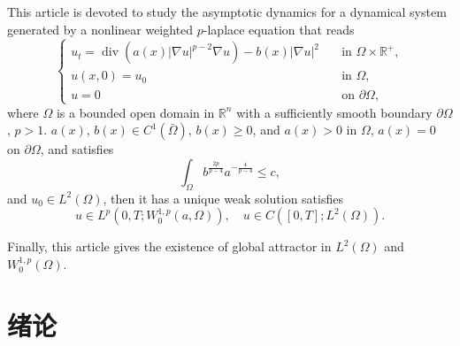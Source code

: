 \documentclass[oneside,longtitle]{LZUthesis}
\numberwithin{equation}{chapter}
\newcommand*\abs[1]{\lvert#1\rvert}
\newcommand\R{\mathbb{R}}
\DeclareMathOperator{\Div}{div}
\begin{document}

\begin{englishabstract}
	This article is devoted to study the asymptotic dynamics for a dynamical system generated by a nonlinear
	weighted $p$-laplace equation that reads
	\begin{equation}\label{eq:main}
		\begin{cases}
			u_t = \Div(a(x)\abs{\nabla u}^{p-2}\nabla u) - b(x)\abs{\nabla u}^2 \quad &\text{in } \Omega \times \R^+,\\
			u(x,0) = u_0 \quad &\text{in } \Omega,\\
			u = 0 \quad &\text{on } \partial\Omega,
		\end{cases}
	\end{equation}
	where $\Omega$ is a bounded open domain in $\R^{n}$ with a sufficiently smooth boundary $\partial\Omega$, $p>1$.
	$ a(x)$, $b(x) \in C^1(\bar{\Omega}) $, $b(x) \geq 0$, and $a(x) > 0$ in $\Omega$, $a(x) = 0$ on $\partial\Omega$, and satisfies
	\begin{equation*}
		\int_{\Omega} b^{\frac{2p}{p-4}}a^{-\frac{4}{p-4}} \leq c,
	\end{equation*}
	and $u_0 \in L^2(\Omega) $, then it has a unique weak solution satisfies
	\begin{equation*}
	u \in L^p(0, T; W_0^{1,p}(a,\Omega)), \quad u \in C([0, T]; L^2(\Omega)).
	\end{equation*}

	Finally, this article gives the existence of global attractor in $L^2(\Omega)$ and $W_0^{1,p}(\Omega)$.
\end{englishabstract}


\tableofcontents{}


\mainmatter

\pagestyle{lzu}


\chapter{绪论}
\end{document}

